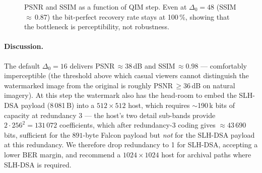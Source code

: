 \documentclass[11pt,a4paper]{article}
\theoremstyle{definition}
\theoremstyle{plain}
\theoremstyle{remark}
\begin{document}
\begin{figure}[!ht]
\centering
{}
\caption{PSNR and SSIM as a function of QIM step. Even at
$\Delta_0\!=\!48$ (SSIM\,$\approx$\,0.87) the bit-perfect recovery rate
stays at 100\,\%, showing that the bottleneck is perceptibility, not
robustness.}\label{fig:exp2}
\end{figure}

\paragraph{Discussion.}
The default $\Delta_0\!=\!16$ delivers PSNR\,$\approx\!38$\,dB and
SSIM\,$\approx\!0.98$ --- comfortably imperceptible (the threshold
above which casual viewers cannot distinguish the watermarked image
from the original is roughly PSNR\,$\geq\!36$\,dB on natural imagery).
At this step the watermark also has the head-room to embed the
SLH-DSA payload (8\,081\,B) into a $512\!\times\!512$ host, which
requires $\sim$190\,k bits of capacity at redundancy 3 --- the
host's two detail sub-bands provide $2 \cdot 256^2 = 131\,072$
coefficients, which after redundancy-3 coding gives $\approx 43\,690$
bits, sufficient for the $891$-byte Falcon payload but \emph{not} for
the SLH-DSA payload at this redundancy. We therefore drop redundancy
to 1 for SLH-DSA, accepting a lower BER margin, and recommend a
$1024\!\times\!1024$ host for archival paths where SLH-DSA is
required.
\end{document}
